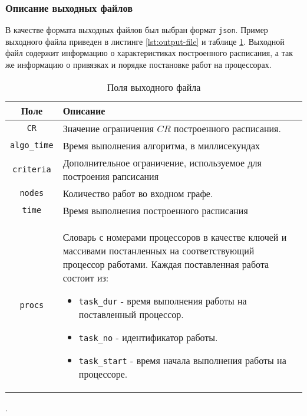 \subsubsection{Описание выходных файлов}
В качестве формата выходных файлов был выбран формат \texttt{json}. Пример выходного файла приведен в листинге \ref{lst:output-file} и таблице \ref{tbl:output-file-fields}. Выходной файл содержит информацию о характеристиках построенного расписания, а так же информацию о привязках и порядке постановке работ на процессорах.
\begin{table}[!htbp]
    \centering
    \begin{tabularx}{\textwidth}{|c|X|}
        \hline
        Поле                & Описание                                                                                                                                                \\
        \hline
        \texttt{CR}         & Значение ограничения $CR$ построенного расписания.                                                                                                      \\
        \hline
        \texttt{algo\_time} & Время выполнения алгоритма, в миллисекундах                                                                                                             \\
        \hline
        \texttt{criteria}   & Дополнительное ограничение, используемое для построения рапсисания                                                                                      \\
        \hline
        \texttt{nodes}      & Количество работ во входном графе.                                                                                                                      \\
        \hline
        \texttt{time}       & Время выполнения построенного расписания                                                                                                                \\
        \hline
        \texttt{procs}      & Словарь с номерами процессоров в качестве ключей и массивами постанленных на соответствующий процессор работами. Каждая поставленная работа состоит из:
        \begin{itemize}
            \item \texttt{task\_dur} - время выполнения работы на поставленный процессор.
            \item \texttt{task\_no} - идентификатор работы.
            \item \texttt{task\_start} - время начала выполнения работы на процессоре.
        \end{itemize}                                                                                                  \\
        \hline
    \end{tabularx}
    \caption{Поля выходного файла}.
    \label{tbl:output-file-fields}
\end{table}


